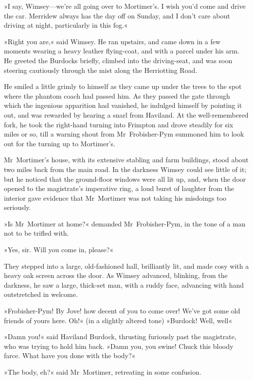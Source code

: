 »I say, Wimsey—we're all going over to Mortimer's. I wish you'd come and drive the car. Merridew always has the day off on Sunday, and I don't care about driving at night, particularly in this fog.«

»Right you are,« said Wimsey. He ran upstairs, and came down in a few moments wearing a heavy leather flying-coat, and with a parcel under his arm. He greeted the Burdocks briefly, climbed into the driving-seat, and was soon steering cautiously through the mist along the Herriotting Road.

He smiled a little grimly to himself as they came up under the trees to the spot where the phantom coach had passed him. As they passed the gate through which the ingenious apparition had vanished, he indulged himself by pointing it out, and was rewarded by hearing a snarl from Haviland. At the well-remembered fork, he took the right-hand turning into Frimpton and drove steadily for six miles or so, till a warning shout from Mr~Frobisher-Pym summoned him to look out for the turning up to Mortimer's.

Mr~Mortimer's house, with its extensive stabling and farm buildings, stood about two miles back from the main road. In the darkness Wimsey could see little of it; but he noticed that the ground-floor windows were all lit up, and, when the door opened to the magistrate's imperative ring, a loud burst of laughter from the interior gave evidence that Mr~Mortimer was not taking his misdoings too seriously.

»Is Mr~Mortimer at home?« demanded Mr~Frobisher-Pym, in the tone of a man not to be trifled with.

»Yes, sir. Will you come in, please?«

They stepped into a large, old-fashioned hall, brilliantly lit, and made cosy with a heavy oak screen across the door. As Wimsey advanced, blinking, from the darkness, he saw a large, thick-set man, with a ruddy face, advancing with hand outstretched in welcome.

»Frobisher-Pym! By Jove! how decent of you to come over! We've got some old friends of yours here. Oh!« (in a slightly altered tone) »Burdock! Well, well\longdash«

»Damn you!« said Haviland Burdock, thrusting furiously past the magistrate, who was trying to hold him back. »Damn you, you swine! Chuck this bloody farce. What have you done with the body?«

»The body, eh?« said Mr~Mortimer, retreating in some confusion.

